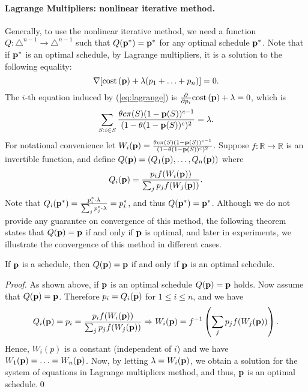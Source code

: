 \paragraph{\bf Lagrange Multipliers: nonlinear iterative method.}
Generally, to use the nonlinear iterative method, we need a function 
$Q:\triangle^{n-1}\rightarrow \triangle^{n-1}$
such that $Q(\mathbf{p}^*) = \mathbf{p}^*$ for any optimal schedule $\mathbf{p}^*$.
Note that if $\mathbf{p}^*$ is an optimal schedule, by Lagrange multipliers, it is a solution to the following equality:
\begin{equation}\label{eq:lagrange}
\nabla [\text{cost}\left( \mathbf{p} \right) + \lambda (p_1+\ldots+p_n)] = 0. 
\end{equation}
The $i$-th equation induced by (\ref{eq:lagrange}) is $\frac{\partial}{\partial p_i} \text{cost}\left( \mathbf{p} \right) + \lambda = 0$, which is
$$\sum_{S:i\in S} \frac{\theta c \pi(S) (1-\mathbf{p}(S))^{c-1}}{(1-\theta(1-\mathbf{p}(S))^c)^2} = \lambda.$$
% 
% 
% 
% 
% 
For notational convenience let $W_i(\mathbf{p}) = \frac{\theta c \pi(S) (1-\mathbf{p}(S))^{c-1}}{(1-\theta(1-\mathbf{p}(S))^c)^2}$.
Suppose $f: \mathbb{R} \rightarrow \mathbb{R}$ is an invertible function, and define $Q(\mathbf{p}) = (Q_1(\mathbf{p}), \ldots, Q_n(\mathbf{p}))$ where 
$$Q_i(\mathbf{p}) = \frac{p_i f(W_i(\mathbf{p}))}{\sum_{j} p_j f(W_j(\mathbf{p}))}.$$
Note that $Q_i(\mathbf{p}^*) = \frac{p^*_i\cdot \lambda}{\sum_j p^*_j\cdot \lambda} = p^*_i$, and thus $Q(\mathbf{p}^*) = \mathbf{p}^*$. Although we do not provide any guarantee on convergence of this method,  the following theorem states that $Q(\mathbf{p}) = \mathbf{p}$ if and only if $\mathbf{p}$ is optimal, and later in experiments, we illustrate the convergence of this method in different cases.
\begin{theorem}\label{thm:iff}
 If $\mathbf{p}$ is a schedule, then $Q(\mathbf{p}) = \mathbf{p}$ if and only if $\mathbf{p}$ is an optimal schedule.
\end{theorem}
\begin{proof}
 As shown above, if $\mathbf{p}$ is an optimal schedule $Q(\mathbf{p})=\mathbf{p}$ holds. Now assume that $Q(\mathbf{p})=\mathbf{p}$. Therefore $p_i = Q_i(\mathbf{p})$ for $1\leq i \leq n$, and we have
 \begin{align*}
  Q_i(\mathbf{p}) = p_i = \frac{p_i f(W_i(\mathbf{p}))}{\sum_{j} p_j f(W_j(\mathbf{p}))} 
  \Rightarrow
  W_i(\mathbf{p}) = f^{-1}\left(\sum_{j} p_j f(W_j(\mathbf{p}))\right).
 \end{align*}
 Hence, $W_i(p)$ is a constant (independent of $i$) and we have $W_1(\mathbf{p})=\ldots=W_n(\mathbf{p})$. Now, by letting $\lambda = W_i(\mathbf{p})$, we obtain a solution for the system of equations in Lagrange multipliers method, and thus, $\mathbf{p}$ is an optimal schedule.\qed
\end{proof}


